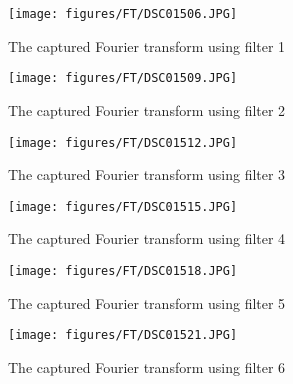 \begin{figure}[H]
    \centering
    \begin{minipage}{0.45\textwidth}
        \centering
        \texttt{[image: figures/FT/DSC01506.JPG]}
        \caption{The captured Fourier transform using filter 1}
    \end{minipage}%
    \begin{minipage}{0.45\textwidth}
        \centering
        \texttt{[image: figures/FT/DSC01509.JPG]}
        \caption{The captured Fourier transform using filter 2}
    \end{minipage}%
    \vspace{2cm}
    \begin{minipage}{0.45\textwidth}
        \centering
        \texttt{[image: figures/FT/DSC01512.JPG]}
        \caption{The captured Fourier transform using filter 3}
    \end{minipage}%
    \begin{minipage}{0.45\textwidth}
        \centering
        \texttt{[image: figures/FT/DSC01515.JPG]}
        \caption{The captured Fourier transform using filter 4}
    \end{minipage}%
    \vspace{2cm}
    \begin{minipage}{0.45\textwidth}
        \centering
        \texttt{[image: figures/FT/DSC01518.JPG]}
        \caption{The captured Fourier transform using filter 5}
    \end{minipage}%
    \begin{minipage}{0.45\textwidth}
        \centering
        \texttt{[image: figures/FT/DSC01521.JPG]}
        \caption{The captured Fourier transform using filter 6}
    \end{minipage}%
\end{figure}